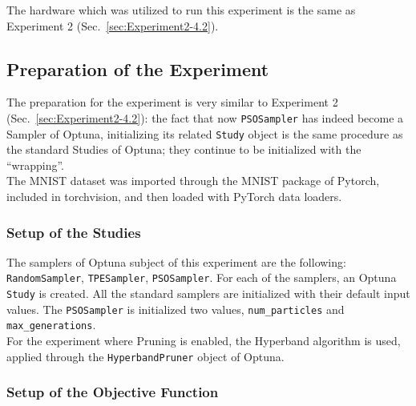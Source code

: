 The hardware which was utilized to run this experiment is the same as Experiment 2 (Sec.~\ref{sec:Experiment2-4.2}).

\subsection{Preparation of the Experiment}

The preparation for the experiment is very similar to Experiment 2 (Sec.~\ref{sec:Experiment2-4.2}): the fact that now \texttt{PSOSampler} has indeed become a Sampler of Optuna, initializing its related \texttt{Study} object is the same procedure as the standard Studies of Optuna; they continue to be initialized with the “wrapping”.
\\[0.3cm]The MNIST dataset was imported through the MNIST package of Pytorch, included in torchvision, and then loaded with PyTorch data loaders.

\subsubsection{Setup of the Studies}

The samplers of Optuna subject of this experiment are the following: \texttt{RandomSampler}, \texttt{TPESampler}, \texttt{PSOSampler}.
For each of the samplers, an Optuna \texttt{Study} is created. All the standard samplers are initialized with their default input values. The \texttt{PSOSampler} is initialized two values, \texttt{num\_particles} and \texttt{max\_generations}.
\\[0.3cm]For the experiment where Pruning is enabled, the Hyperband algorithm is used, applied through the \texttt{HyperbandPruner} object of Optuna.

\subsubsection{Setup of the Objective Function}

